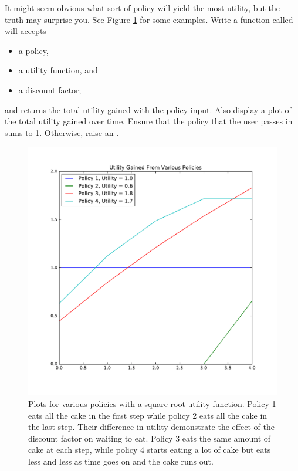 \begin{problem}

It might seem obvious what sort of policy will yield the most utility, but the truth may surprise you.
See Figure \ref{fig:diff_pols} for some examples.
Write a function called  will accepts
\begin{itemize}
\item a policy,
\item a utility function, and
\item a discount factor;
\end{itemize}
and returns the total utility gained with the policy input.
Also display a plot of the total utility gained over time.
Ensure that the policy that the user passes in sums to 1.
Otherwise, raise an .

\end{problem}
\begin{figure}
\includegraphics[width=\textwidth]{diff_policies.pdf}
\caption{Plots for various policies with a square root utility function.  Policy 1 eats all the cake in the first step while policy 2 eats all the cake in the last step.  Their difference in utility demonstrate the effect of the discount factor on waiting to eat.  Policy 3 eats the same amount of cake at each step, while policy 4 starts eating a lot of cake but eats less and less as time goes on and the cake runs out.}
\label{fig:diff_pols}
\end{figure}

